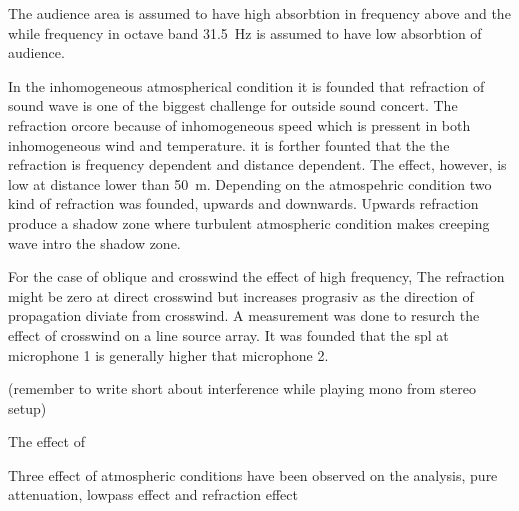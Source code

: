 The audience area is assumed to have high absorbtion in frequency above  and the while frequency in octave band \SI{31.5}{\hertz} is assumed to have low absorbtion of audience.  


In the inhomogeneous atmospherical condition it is founded that refraction of sound wave is one of the biggest challenge for outside sound concert. The refraction orcore because of inhomogeneous speed which is pressent in both inhomogeneous wind and temperature. it is forther founted that the the refraction is frequency dependent and distance dependent. The effect, however, is low at distance lower than \SI{50}{\meter}. Depending on the atmospehric condition two kind of refraction was founded, upwards and downwards. Upwards refraction produce a shadow zone where turbulent atmospheric condition makes creeping wave intro the shadow zone. 


For the case of oblique and crosswind the effect of high frequency, The refraction might be zero at direct crosswind but increases prograsiv as the direction of propagation diviate from crosswind. A measurement was done to resurch the effect of crosswind on a line source array. It was founded that the \gls{spl} at microphone 1 is generally higher that microphone 2.   

  

(remember to write short about interference while playing mono from stereo setup)    


The effect of 

Three effect of atmospheric conditions have been observed on the analysis, pure attenuation, lowpass effect and refraction effect
